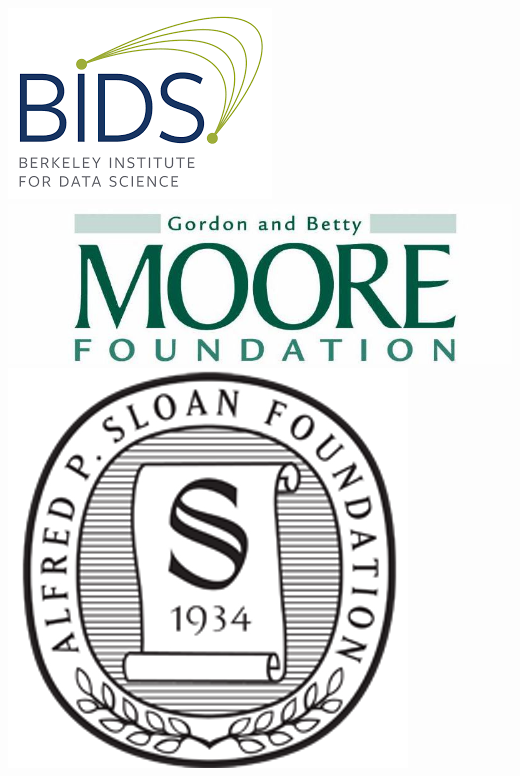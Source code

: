 \documentclass[11pt,xcolor=dvipsnames]{beamer}
\begin{document}
\begin{frame}
\begin{columns}
\begin{column}{0.08\linewidth}
\includegraphics[width=0.9\linewidth]{images/bids.png} \\
\vspace{15pt}
\includegraphics[width=0.9\linewidth]{images/moore_foundation.jpg} \\
\vspace{15pt}
\includegraphics[width=0.9\linewidth]{images/sloan_foundation.png}
\end{column}
\end{columns}

\end{frame}
\end{document}
